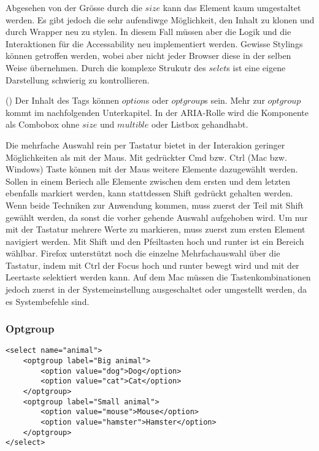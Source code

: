 Abgesehen von der Grösse durch die $size$ kann das Element kaum umgestaltet werden.
Es gibt jedoch die sehr aufendiwge Möglichkeit, den Inhalt zu klonen und durch Wrapper neu zu stylen.
In diesem Fall müssen aber die Logik und die Interaktionen für die Accessability neu implementiert werden.
Gewisse Stylings können getroffen werden, wobei aber nicht jeder Browser diese in der selben Weise übernehmen.
Durch die komplexe Strukutr des $selet$s ist eine eigene Darstellung schwierig zu kontrollieren.

(\cite{selectMdn}) Der Inhalt des Tags können $option$s oder $optgroup$s sein.
Mehr zur $optgroup$ kommt im nachfolgenden Unterkapitel.
In der ARIA-Rolle wird die Komponente als Combobox ohne $size$ und $multible$ oder Listbox gehandhabt.

Die mehrfache Auswahl rein per Tastatur bietet in der Interakion geringer Möglichkeiten als mit der Maus.
Mit gedrückter Cmd bzw. Ctrl (Mac bzw. Windows) Taste können mit der Maus weitere Elemente dazugewählt werden.
Sollen in einem Beriech alle Elemente zwischen dem ersten und dem letzten ebenfalls markiert werden, kann stattdessen Shift gedrückt gehalten werden.
Wenn beide Techniken zur Anwendung kommen, muss zuerst der Teil mit Shift gewählt werden, da sonst die vorher gehende Auswahl aufgehoben wird.
Um nur mit der Tastatur mehrere Werte zu markieren, muss zuerst zum ersten Element navigiert werden.
Mit Shift und den Pfeiltasten hoch und runter ist ein Bereich wählbar.
Firefox unterstützt noch die einzelne Mehrfachauswahl über die Tastatur, indem mit Ctrl der Focus hoch und runter bewegt wird und mit der Leertaste selektiert werden kann.
Auf dem Mac müssen die Tastenkombinationen jedoch zuerst in der Systemeinstellung ausgeschaltet oder umgestellt werden, da es Systembefehle sind.


\subsubsection{Optgroup}

\begin{lstlisting}[style = htmlcssjs, caption = Optgroup Example, label = code:OptgroupExample]
<select name="animal">
    <optgroup label="Big animal">
        <option value="dog">Dog</option>
        <option value="cat">Cat</option>
    </optgroup>
    <optgroup label="Small animal">
        <option value="mouse">Mouse</option>
        <option value="hamster">Hamster</option>
    </optgroup>
</select>
\end{lstlisting}

